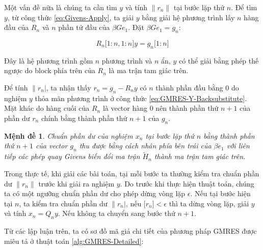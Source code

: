 \documentclass[14pt, a4paper]{article}
\numberwithin{equation}{section}
\numberwithin{algorithm}{section}
\numberwithin{figure}{section}
\newtheorem{md}{Mệnh đề}
\numberwithin{dl}{section}
\numberwithin{md}{section}
\numberwithin{bd}{section}
\numberwithin{dn}{section}
\begin{document}
Một vấn đề nữa là chúng ta cần tìm $y$ và tính $\lVert r_n \rVert$ tại bước lặp thứ $n$.
Để tìm $y$, từ công thức \ref{eq:Givens-Apply}, ta giải $y$ bằng giải hệ phương trình lấy $n$ hàng đầu của $R_n$ và $n$ phần tử đầu của $\beta G e_1$. Đặt $\beta G e_1 = g_n$:

\begin{equation} \label{eq:GMRES-Y-Backsubstitute}
    R_n \lbrack 1:n,1:n \rbrack y = g_n \lbrack 1:n \rbrack
\end{equation}

Đây là hệ phương trình gồm $n$ phương trình và $n$ ẩn, $y$ có thể giải bằng phép thế ngược do block phía trên của $R_n$ là ma trận tam giác trên.

Để tính $\lVert r_n \rvert$, ta nhận thấy $r_n=g_n - R_n y$ có $n$ thành phần đầu bằng 0 do nghiệm $y$ thỏa mãn phương trình ở công thức \ref{eq:GMRES-Y-Backsubstitute}. Mặt khác do hàng cuối của $R_n$ là vector hàng 0 nên thành phần thứ $n+1$ của phần dư $r_n$ chính bằng thành phần thứ $n+1$ của $g_n$.

\begin{md}
    Chuẩn phần dư của nghiệm $x_n$ tại bước lặp thứ $n$ bằng thành phần thứ $n+1$ của vector $g_n$ thu được bằng cách nhân phía bên trái của $\beta e_1$ với liên tiếp các phép quay Givens biến đổi ma trận $\widetilde{H}_n$ thành ma trận tam giác trên.
\end{md}

Trong thực tế, khi giải các bài toán, tại mỗi bước ta thường kiểm tra chuẩn phần dư $\lVert r_n \rVert$ trước khi giải ra nghiệm $y$. Do trước khi thực hiện thuật toán, chúng ta có một ngưỡng chuẩn phần dư cho phép dừng vòng lặp $\epsilon$. Nếu tại bước hiện tại $n$, ta kiểm tra chuẩn phần dư $\lVert r_n \rvert$, nếu $\lbrack r_n \rbrack < \epsilon$ thì ta dừng vòng lặp, giải $y$ và tính $x_n=Q_n y$. Nếu không ta chuyển sang bước thứ $n+1$.

Từ các lập luận trên, ta có sơ đồ mã giả chi tiết của phương pháp GMRES được miêu tả ở thuật toán \ref{alg:GMRES-Detailed}:
\end{document}
